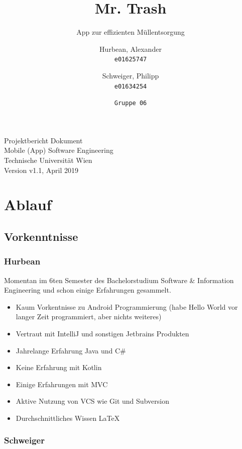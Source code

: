 \documentclass{mrtrash}
\title{\vspace{-1cm}Mr. Trash}
\subtitle{App zur effizienten Müllentsorgung}
\author{
    Hurbean, Alexander\\
    \texttt{e01625747}
    \and
    Schweiger, Philipp\\
    \texttt{e01634254}
    \and
    \texttt{Gruppe 06}}
\begin{document}
\maketitle

\null\vfill
\noindent
Projektbericht Dokument\\ 
Mobile (App) Software Engineering\\
Technische Universität Wien\\
Version v1.1, April 2019
\newpage

\tableofcontents

\chapter{Ablauf}

\section{Vorkenntnisse}

\subsection{Hurbean}

Momentan im 6ten Semester des Bachelorstudium Software \& Information Engineering und schon einige Erfahrungen gesammelt.

\begin{itemize}
    \item Kaum Vorkentnisse zu Android Programmierung (habe Hello World vor langer Zeit programmiert, aber nichts weiteres)
    \item Vertraut mit IntelliJ und sonstigen Jetbrains Produkten
    \item Jahrelange Erfahrung Java und C\#
    \item Keine Erfahrung mit Kotlin
    \item Einige Erfahrungen mit MVC
    \item Aktive Nutzung von VCS wie Git und Subversion
    \item Durchschnittliches Wissen \LaTeX
\end{itemize}

\begin{minipage}[t]{\textwidth}
    \centering
\end{minipage}

\subsection{Schweiger}
\end{document}

